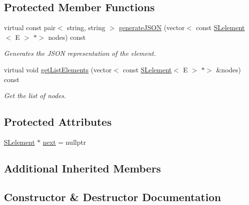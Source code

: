 \subsection*{Protected Member Functions}
\begin{DoxyCompactItemize}
\item 
virtual const pair$<$ string, string $>$ \hyperlink{classbridges_1_1datastructure_1_1_s_lelement_a15d224314bbda510603042b504322410}{generate\+J\+S\+ON} (vector$<$ const \hyperlink{classbridges_1_1datastructure_1_1_s_lelement}{S\+Lelement}$<$ E $>$ $\ast$$>$ nodes) const
\begin{DoxyCompactList}\small\item\em Generates the J\+S\+ON representation of the element. \end{DoxyCompactList}\item 
virtual void \hyperlink{classbridges_1_1datastructure_1_1_s_lelement_a81b68786cb93fe0f7edb48af789535a5}{get\+List\+Elements} (vector$<$ const \hyperlink{classbridges_1_1datastructure_1_1_s_lelement}{S\+Lelement}$<$ E $>$ $\ast$$>$ \&nodes) const
\begin{DoxyCompactList}\small\item\em Get the list of nodes. \end{DoxyCompactList}\end{DoxyCompactItemize}
\subsection*{Protected Attributes}
\begin{DoxyCompactItemize}
\item 
\hyperlink{classbridges_1_1datastructure_1_1_s_lelement}{S\+Lelement} $\ast$ \hyperlink{classbridges_1_1datastructure_1_1_s_lelement_afc016a593a4a5aba82021ee34edadbfc}{next} = nullptr
\end{DoxyCompactItemize}
\subsection*{Additional Inherited Members}


\subsection{Constructor \& Destructor Documentation}
\mbox{\label{classbridges_1_1datastructure_1_1_s_lelement_ac69e99f5b2b729a217160ee0517751aa}} 
